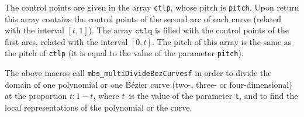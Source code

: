 The control points are given in the array \texttt{ctlp}, whose pitch is
\texttt{pitch}. Upon return this array contains the control points of the
second arc of each curve (related with the interval $[t,1]$).
The array $\texttt{ctlq}$ is filled with the control points of the first
arcs, related with the interval $[0,t]$. The pitch of this array is the
same as the pitch of \texttt{ctlp} (it is equal to the value of
the parameter \texttt{pitch}).


\vspace{\bigskipamount}
\begin{sloppypar}
The above macros call \texttt{mbs\_multiDivideBezCurvesf} in order to
divide the domain of one polynomial or one B\'{e}zier curve
(two-, three- or four-dimensional) at the proportion $t:1-t$, where $t$~is
the value of the parameter \texttt{t}, and to find the local representations
of the polynomial or the curve.
\end{sloppypar}


